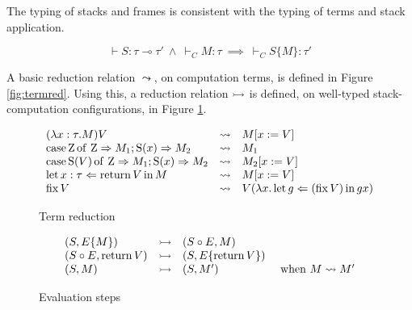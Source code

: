 

\begin{alemma}
    The typing of stacks and frames is consistent
    with the typing of terms and stack application.

    \begin{equation*}
        \vdash S : \tau \multimap \tau'  ~ \wedge ~ 
        \vdash_C M : \tau
        ~ \implies ~
        \vdash_C S\{M\} : \tau'
    \end{equation*}
\end{alemma}


A basic reduction relation $\leadsto$, on computation terms, 
is defined in Figure \ref{fig:termred}. Using this, a reduction relation $\reduces$ is
defined, on well-typed stack-computation configurations, in 
Figure \ref{fig:evalstep}.


\begin{figure}[h]
    \begin{center}
        \begin{equation*}
            \begin{array}{lcl}
                (\lambda x:\tau. M) V & \leadsto & M[x := V] \\
                \lcase{\Zero}{M_1}{M_2} & \leadsto & M_1 \\
                \lcase{\Succ(V)}{M_1}{M_2} & \leadsto & M_2[x := V] \\
                \Bind{\Ret V}{x : \tau}{M} & \leadsto & M[x := V] \\
                \Fix V & \leadsto & V (\lambda x. \Bind{(\Fix V)}{g}{g x})
            \end{array}
        \end{equation*}
    \end{center}
    \caption{Term reduction}
    \label{fig:termred}
    \begin{center}
        \begin{equation*}
            \begin{array}{lclr}
                (S,E\{M\}) & \reduces & (S \circ E, M) \\
                (S \circ E, \Ret V) & \reduces & (S, E \{ \Ret V \}) \\
                (S,M) & \reduces & (S,M') & \text{ when } M \leadsto M'
            \end{array}
        \end{equation*}
    \end{center}
    \caption{Evaluation steps}
    \label{fig:evalstep}
\end{figure}

